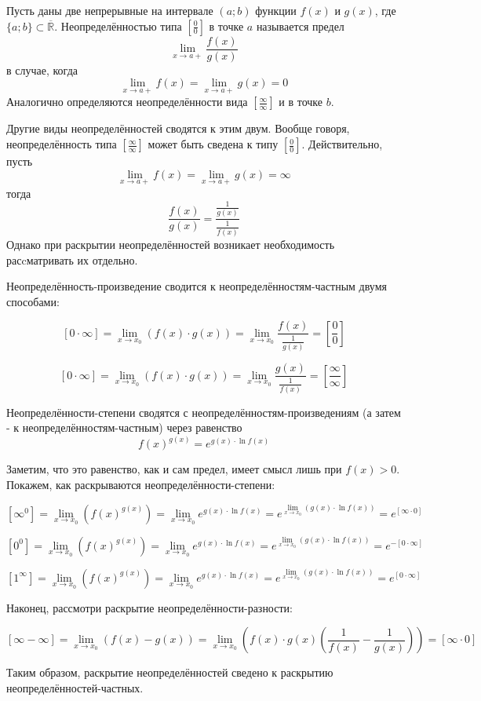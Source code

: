 Пусть даны две непрерывные на интервале $(a; b)$ функции $f(x)$ и $g(x)$, где $\{a; b\} \subset \overline{\mathbb{R}}$. Неопределённостью типа $\left[\frac{0}{0}\right]$ в точке $a$ называется предел 
\[
\lim_{x \to a+}\frac{f(x)}{g(x)}
\]
в случае, когда
\[
\lim_{x \to a+}f(x) = \lim_{x \to a+}g(x) = 0
\]
Аналогично определяются неопределённости вида $\left[\frac{\infty}{\infty}\right]$ и в точке $b$.

Другие виды неопределённостей сводятся к этим двум. Вообще говоря, неопределённость типа $\left[\frac{\infty}{\infty}\right]$ может быть сведена к типу $\left[\frac{0}{0}\right]$. Действительно, пусть
$$\lim_{x \to a+}f(x) = \lim_{x \to a+}g(x) = \infty$$
тогда
\[
\frac{f(x)}{g(x)}=\frac{\frac{1}{g(x)}}{\frac{1}{f(x)}}
\]
Однако при раскрытии неопределённостей возникает необходимость расcматривать их отдельно.

Неопределённость-произведение сводится к неопределённостям-частным двумя способами:

$$
[0 \cdot \infty]=\lim_{x\to x_0}(f(x) \cdot g(x))=\lim_{x\to x_0}\frac{f(x)}{\frac{1}{g(x)}}=\left[\frac{0}{0}\right]
$$

$$
[0 \cdot \infty]=\lim_{x\to x_0}(f(x) \cdot g(x))=\lim_{x\to x_0}\frac{g(x)}{\frac{1}{f(x)}}=\left[\frac{\infty}{\infty}\right]
$$

Неопределённости-степени сводятся с неопределённостям-произведениям (а затем - к неопределённостям-частным) через равенство 
$$
f(x) ^ {g(x)}=e^{g(x) \cdot \ln f(x)}
$$

Заметим, что это равенство, как и сам предел, имеет смысл лишь при $f(x)>0$.
Покажем, как раскрываются неопределённости-степени:

$$
[\infty ^0]=\lim_{x\to x_0}(f(x) ^{g(x)})=\lim_{x\to x_0}e^{g(x) \cdot \ln f(x)}=e^{\lim_{x\to x_0}(g(x) \cdot \ln f(x))}=e^{[\infty \cdot 0]}
$$

$$
[0^0]=\lim_{x\to x_0}(f(x) ^{g(x)})=\lim_{x\to x_0}e^{g(x) \cdot \ln f(x)}=e^{\lim_{x\to x_0}(g(x) \cdot \ln f(x))}=e^{-[0 \cdot \infty]}
$$

$$
[1 ^\infty]=\lim_{x\to x_0}(f(x) ^{g(x)})=\lim_{x\to x_0}e^{g(x) \cdot \ln f(x)}=e^{\lim_{x\to x_0}(g(x) \cdot \ln f(x))}=e^{[0 \cdot \infty]}
$$

Наконец, рассмотри раскрытие неопределённости-разности:

$$
[\infty - \infty]=\lim_{x\to x_0}(f(x) - g(x))=\lim_{x\to x_0}\left(f(x) \cdot g(x)\left(\frac{1}{f(x)}-\frac{1}{g(x)}\right)\right)=[\infty \cdot 0]
$$

Таким образом, раскрытие неопределённостей сведено к раскрытию неопределённостей-частных.
